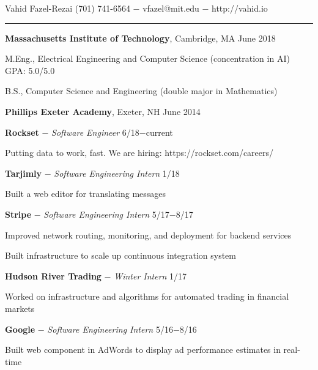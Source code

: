 \documentclass[11pt]{article}
\newcommand{\msection}[1]{\vspace{1em}\marginnote{#1}} %
\newcommand{\bt}[1]{\textbf{#1}} %
\newcommand{\gap}[0]{\vspace{0.7em}} %
\newcommand{\dash}[0]{ $-$ } %
\begin{document}

{\Huge Vahid Fazel-Rezai} \hfill  (701) 741-6564\dash vfazel@mit.edu\dash http://vahid.io

\vspace{0.4em}

\hspace{-1.2in}\rule{7.9in}{0.2em}

\vspace{-0.2em}



\msection{Education}

\bt{Massachusetts Institute of Technology}, Cambridge, MA \hfill June 2018

M.Eng., Electrical Engineering and Computer Science (concentration in AI) \hfill GPA: 5.0/5.0

B.S., Computer Science and Engineering (double major in Mathematics)

\gap

\bt{Phillips Exeter Academy}, Exeter, NH \hfill June 2014



\msection{Work}

\bt{Rockset}\dash \emph{Software Engineer} \hfill 6/18$-$current

Putting data to work, fast. We are hiring: https://rockset.com/careers/

\gap

\bt{Tarjimly}\dash \emph{Software Engineering Intern} \hfill 1/18

Built a web editor for translating messages

\gap

\bt{Stripe}\dash \emph{Software Engineering Intern} \hfill 5/17$-$8/17

Improved network routing, monitoring, and deployment for backend services

Built infrastructure to scale up continuous integration system

\gap

\bt{Hudson River Trading}\dash \emph{Winter Intern} \hfill 1/17

Worked on infrastructure and algorithms for automated trading in financial markets

\gap

\bt{Google}\dash \emph{Software Engineering Intern} \hfill 5/16$-$8/16

Built web component in AdWords to display ad performance estimates in real-time
\end{document}
